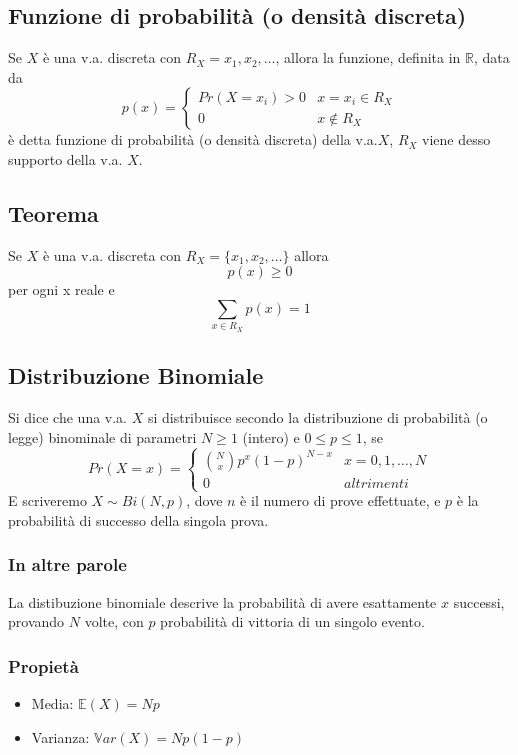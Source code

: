 \documentclass[a4paper]{report}
\begin{document}
  \subsection{Funzione di probabilità (o densità discreta)}
  Se $X$ è una v.a. discreta con $R_X = {x_1,x_2,\dots}$, allora la funzione, definita in $\mathbb{R}$, data da
  \[
    p(x) =
      \begin{cases}
         Pr(X = x_i) > 0 & x = x_i \in R_X \\
         0  & x \not\in R_X
      \end{cases}
  \]
  è detta funzione di probabilità (o densità discreta) della v.a.$X$, $R_X$ viene desso supporto della v.a. $X$.

  \subsection{Teorema}
  Se $X$ è una v.a. discreta con $R_X = \{ x_1,x_2,\dots \}$ allora
  \[ p(x) \geq 0 \] per ogni x reale e \[ \sum_{x\in R_X} p(x) = 1 \]

  \subsection{Distribuzione Binomiale}
  Si dice che una v.a. $X$ si distribuisce secondo la distribuzione di probabilità (o legge) binominale di parametri $N \geq 1$ (intero) e $0 \leqslant p \leqslant 1$, se
  \[
    Pr(X = x) =
      \begin{cases}
          \binom{N}{x}p^x(1-p)^{N-x} & x = 0, 1, \dots, N \\
          0 & altrimenti
      \end{cases}
  \]
   E scriveremo $ X \sim Bi(N,p) $, dove $n$ è il numero di prove effettuate, e $p$ è la probabilità di successo della singola prova.
   \subsubsection{In altre parole}
   La distibuzione binomiale descrive la probabilità di avere esattamente $x$ successi, provando $N$ volte, con $p$ probabilità di vittoria di un singolo evento.

   \subsubsection{Propietà}
   \begin{itemize}
     \item Media: $\mathbb{E}(X) = Np$
     \item Varianza: $\mathbb{V}ar(X) = Np(1-p)$
   \end{itemize}
\end{document}
